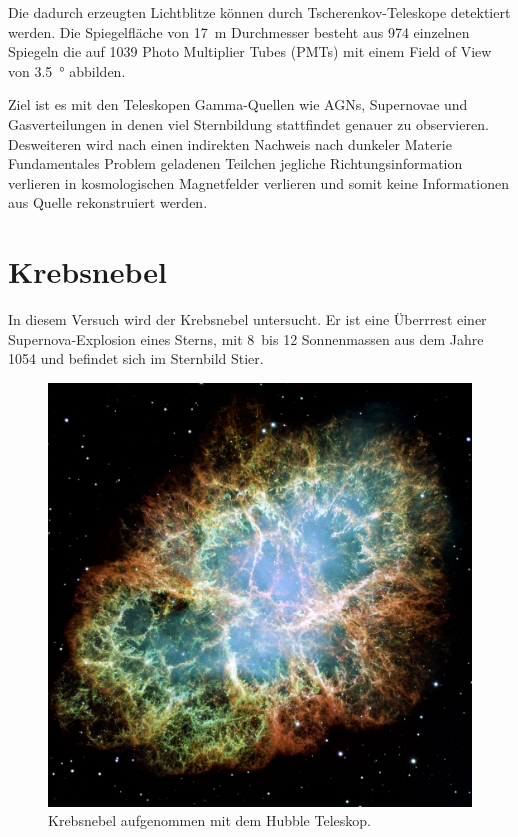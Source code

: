Die dadurch erzeugten Lichtblitze können durch Tscherenkov-Teleskope detektiert
werden.
Die Spiegelfläche von \SI{17}{\meter} Durchmesser besteht aus \num{974} einzelnen
Spiegeln die auf \num{1039} Photo Multiplier Tubes (PMTs) mit einem
Field of View von \SI{3.5}{\degree} abbilden.

Ziel ist es mit den Teleskopen Gamma-Quellen wie AGNs, Supernovae und
Gasverteilungen in denen viel Sternbildung stattfindet genauer zu observieren.
Desweiteren wird nach einen indirekten Nachweis nach dunkeler Materie
Fundamentales Problem geladenen Teilchen jegliche Richtungsinformation verlieren
in kosmologischen Magnetfelder verlieren und somit keine Informationen aus
Quelle rekonstruiert werden.

\section*{Krebsnebel}%
\label{sec:krebsnebel}

In diesem Versuch wird der Krebsnebel untersucht. 
Er ist eine Überrrest einer Supernova-Explosion eines Sterns,
mit 8~bis 12 Sonnenmassen aus dem Jahre 1054 
und befindet sich im Sternbild Stier.
\begin{figure}
		\includegraphics[width=\linewidth]{pictures/crab.jpg}
		\caption{Krebsnebel aufgenommen mit dem Hubble Teleskop.}%
		\label{fig:magic}
\end{figure}

